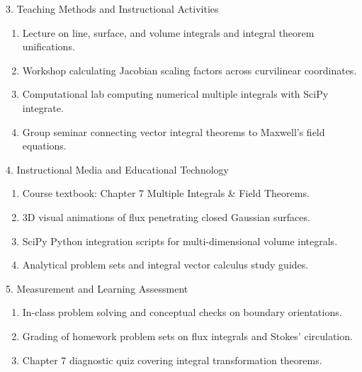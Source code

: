 \newpage

\begin{planbox}[colframe=rbruNavy!85!black, colbacktitle=rbruNavy!85!black]{3. Teaching Methods and Instructional Activities}
\begin{enumerate}[topsep=2pt, itemsep=1pt, partopsep=0pt, parsep=0pt, leftmargin=1.5em]
    \item Lecture on line, surface, and volume integrals and integral theorem unifications.
    \item Workshop calculating Jacobian scaling factors across curvilinear coordinates.
    \item Computational lab computing numerical multiple integrals with SciPy integrate.
    \item Group seminar connecting vector integral theorems to Maxwell's field equations.
\end{enumerate}
\end{planbox}

\begin{planbox}[colframe=rbruGold!90!black, colbacktitle=rbruGold!90!black]{4. Instructional Media and Educational Technology}
\begin{enumerate}[topsep=2pt, itemsep=1pt, partopsep=0pt, parsep=0pt, leftmargin=1.5em]
    \item Course textbook: Chapter 7 Multiple Integrals \& Field Theorems.
    \item 3D visual animations of flux penetrating closed Gaussian surfaces.
    \item SciPy Python integration scripts for multi-dimensional volume integrals.
    \item Analytical problem sets and integral vector calculus study guides.
\end{enumerate}
\end{planbox}

\begin{planbox}[colframe=rbruSlate, colbacktitle=rbruSlate]{5. Measurement and Learning Assessment}
\begin{enumerate}[topsep=2pt, itemsep=1pt, partopsep=0pt, parsep=0pt, leftmargin=1.5em]
    \item In-class problem solving and conceptual checks on boundary orientations.
    \item Grading of homework problem sets on flux integrals and Stokes' circulation.
    \item Chapter 7 diagnostic quiz covering integral transformation theorems.
\end{enumerate}
\end{planbox}
\clearpage

